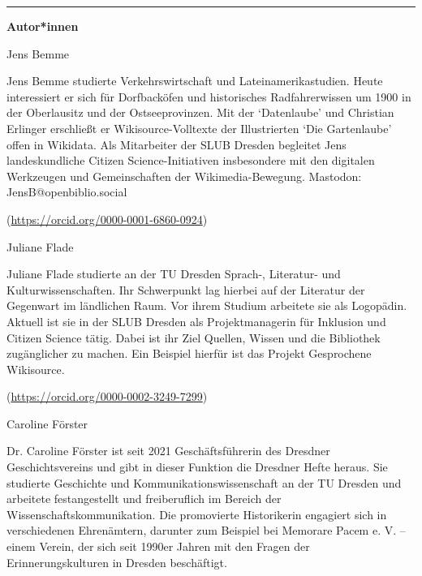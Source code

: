 \begin{center}\rule{0.5\linewidth}{0.5pt}\end{center}

\textbf{Autor*innen}

Jens Bemme

Jens Bemme studierte Verkehrswirtschaft und Lateinamerikastudien. Heute interessiert er sich für Dorfbacköfen 
und historisches Radfahrerwissen um 1900 in der Oberlausitz und der Ostseeprovinzen. Mit der ‘Datenlaube’ und 
Christian Erlinger erschließt er Wikisource-Volltexte der Illustrierten ‘Die Gartenlaube’ offen in Wikidata. 
Als Mitarbeiter der SLUB Dresden begleitet Jens landeskundliche Citizen Science-Initiativen insbesondere mit 
den digitalen Werkzeugen und Gemeinschaften der Wikimedia-Bewegung. Mastodon: JensB@openbiblio.social

(\url{https://orcid.org/0000-0001-6860-0924})

Juliane Flade

Juliane Flade studierte an der TU Dresden Sprach-, Literatur- und Kulturwissenschaften. Ihr Schwerpunkt lag hierbei 
auf der Literatur der Gegenwart im ländlichen Raum. Vor ihrem Studium arbeitete sie als Logopädin. Aktuell ist sie 
in der SLUB Dresden als Projektmanagerin für Inklusion und Citizen Science tätig. Dabei ist ihr Ziel Quellen, Wissen 
und die Bibliothek zugänglicher zu machen. Ein Beispiel hierfür ist das Projekt Gesprochene Wikisource.

(\url{https://orcid.org/0000-0002-3249-7299})

Caroline Förster

Dr. Caroline Förster ist seit 2021 Geschäftsführerin des Dresdner Geschichtsvereins und gibt in dieser Funktion 
die Dresdner Hefte heraus. Sie studierte Geschichte und Kommunikationswissenschaft an der TU Dresden und arbeitete 
festangestellt und freiberuflich im Bereich der Wissenschaftskommunikation. Die promovierte Historikerin engagiert 
sich in verschiedenen Ehrenämtern, darunter zum Beispiel bei Memorare Pacem e. V. – einem Verein, der sich seit 1990er 
Jahren mit den Fragen der Erinnerungskulturen in Dresden beschäftigt.
